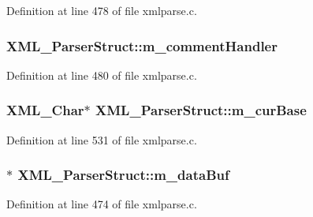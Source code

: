 Definition at line 478 of file xmlparse.\+c.

\subsubsection[{\texorpdfstring{m\+\_\+comment\+Handler}{m_commentHandler}}]{ X\+M\+L\+\_\+\+Parser\+Struct\+::m\+\_\+comment\+Handler}\hypertarget{struct_x_m_l___parser_struct_a11f04d39e260cdc3355961c41cde40e8}{}\label{struct_x_m_l___parser_struct_a11f04d39e260cdc3355961c41cde40e8}


Definition at line 480 of file xmlparse.\+c.

\subsubsection[{\texorpdfstring{m\+\_\+cur\+Base}{m_curBase}}]{ {\bf X\+M\+L\+\_\+\+Char}$\ast$ X\+M\+L\+\_\+\+Parser\+Struct\+::m\+\_\+cur\+Base}\hypertarget{struct_x_m_l___parser_struct_a4e5c65124bc1075886fd8a73899fdc4c}{}\label{struct_x_m_l___parser_struct_a4e5c65124bc1075886fd8a73899fdc4c}


Definition at line 531 of file xmlparse.\+c.

\subsubsection[{\texorpdfstring{m\+\_\+data\+Buf}{m_dataBuf}}]{$\ast$ X\+M\+L\+\_\+\+Parser\+Struct\+::m\+\_\+data\+Buf}\hypertarget{struct_x_m_l___parser_struct_a1e4a84577848edcca70b39490fc9579b}{}\label{struct_x_m_l___parser_struct_a1e4a84577848edcca70b39490fc9579b}


Definition at line 474 of file xmlparse.\+c.

